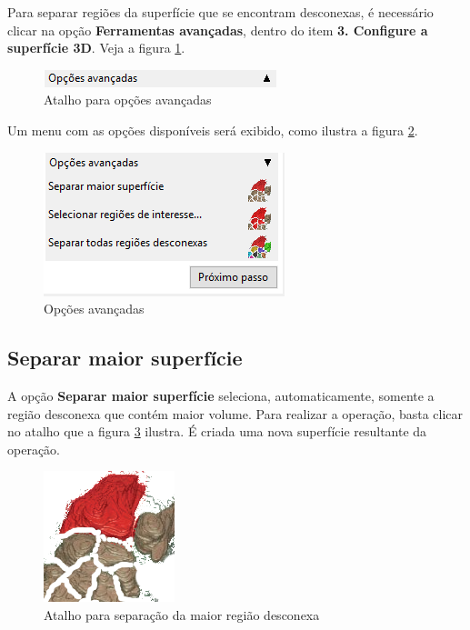 Para separar regiões da superfície que se encontram desconexas, é necessário clicar na opção
\textbf{Ferramentas avançadas}, dentro do item \textbf{3. Configure a superfície 3D}. Veja a
figura \ref{fig:advanced_tools}.

\begin{figure}[!htb]
\centering
\includegraphics[scale=0.7]{../user_guide_figures/invesalius_screen/surface_painel_advanced_options_pt.png}
\caption{Atalho para opções avançadas}
\label{fig:advanced_tools}
\end{figure}

\newpage

Um menu com as opções disponíveis será exibido, como ilustra a figura
\ref{fig:advanced_tools_expanded}.

\begin{figure}[!htb]
\centering
\includegraphics[scale=0.7]{../user_guide_figures/invesalius_screen/surface_split_pt.png}
\caption{Opções avançadas}
\label{fig:advanced_tools_expanded}
\end{figure}

\subsection{Separar maior superfície}

A opção \textbf{Separar maior superfície} seleciona, automaticamente, somente a região
desconexa que contém maior volume. Para realizar a operação, basta clicar no atalho
que a figura \ref{fig:short_connectivity_largest} ilustra. É criada uma nova superfície
resultante da operação.

\begin{figure}[!htb]
\centering
\includegraphics[scale=0.2]{../user_guide_figures/icons/connectivity_largest.png}
\caption{Atalho para separação da maior região desconexa}
\label{fig:short_connectivity_largest}
\end{figure}

